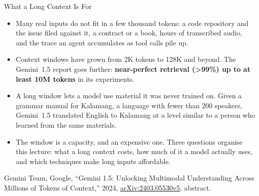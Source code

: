 \begin{frame}{What a Long Context Is For}
  \begin{itemize}\itemsep0.45em
    \item[\textcolor{red}{$\blacktriangleright$}] Many real inputs do not fit in a few thousand tokens: a code repository and the issue filed against it, a contract or a book, hours of transcribed audio, and the trace an agent accumulates as tool calls pile up.
    \item[\textcolor{red}{$\blacktriangleright$}] Context windows have grown from 2K tokens to 128K and beyond. The Gemini~1.5 report goes further: \textbf{near-perfect retrieval (\textgreater 99\%) up to at least 10M tokens} in its experiments.
    \item[\textcolor{red}{$\blacktriangleright$}] A long window lets a model use material it was never trained on. Given a grammar manual for Kalamang, a language with fewer than 200 speakers, Gemini~1.5 translated English to Kalamang at a level similar to a person who learned from the same materials.
    \item[\textcolor{red}{$\blacktriangleright$}] The window is a capacity, and an expensive one. Three questions organise this lecture: what a long context costs, how much of it a model actually uses, and which techniques make long inputs affordable.
  \end{itemize}
  \vspace{0.2em}
  {\scriptsize Gemini Team, Google, ``Gemini 1.5: Unlocking Multimodal Understanding Across Millions of Tokens of Context,'' 2024, \href{https://arxiv.org/abs/2403.05530v5}{arXiv:2403.05530v5}, abstract.}
\end{frame}

